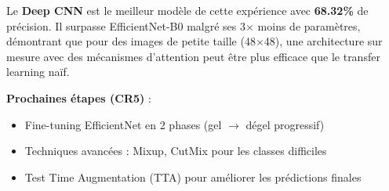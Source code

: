 \documentclass[12pt,a4paper]{article}
\begin{document}
Le \textbf{Deep CNN} est le meilleur modèle de cette expérience avec \textbf{68.32\%} de précision. Il surpasse EfficientNet-B0 malgré ses 3$\times$ moins de paramètres, démontrant que pour des images de petite taille (48$\times$48), une architecture sur mesure avec des mécanismes d'attention peut être plus efficace que le transfer learning naïf.

\textbf{Prochaines étapes (CR5)} :
\begin{itemize}
    \item Fine-tuning EfficientNet en 2 phases (gel $\rightarrow$ dégel progressif)
    \item Techniques avancées : Mixup, CutMix pour les classes difficiles
    \item Test Time Augmentation (TTA) pour améliorer les prédictions finales
\end{itemize}
\end{document}
